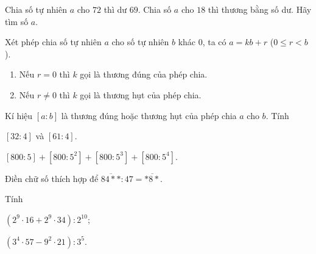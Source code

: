 \begin{bt}
Chia số tự nhiên $ a $ cho $ 72 $ thì dư $ 69 $. Chia số $ a $ cho $ 18 $ thì thương bằng số dư. Hãy tìm số $ a $.
\end{bt}
\begin{bt}
	Xét phép chia số tự nhiên $ a $ cho số tự nhiên $ b $ khác $ 0 $, ta có $ a=kb+r $ ($ 0\leq r<b $).
	\begin{enumerate}[ ]
		\item Nếu $ r=0 $ thì $ k $ gọi là thương đúng của phép chia.
		\item Nếu $ r\neq 0 $ thì $ k $ gọi là thương hụt của phép chia.
	\end{enumerate}
Kí hiệu $ [a:b] $ là thương đúng hoặc thương hụt của phép chia $ a $ cho $ b $. Tính
\begin{enumEX}{2}
	\item $ [32:4] $ và $ [61:4] $.
	\item $ [800:5]+[800:5^{2}]+[800:5^{3}]+[800:5^{4}] $.
\end{enumEX}
\end{bt}
\begin{bt}
Điền chữ số thích hợp để $ \overline{84**}:47=\overline{*8*} $.
\end{bt}
\begin{bt}
Tính 
\begin{enumEX}{2}
	\item $ (2^{9}\cdot 16+2^{9}\cdot 34):2^{10} $;
	\item $ (3^{4}\cdot 57-9^{2}\cdot 21):3^{5} $.
\end{enumEX}
\end{bt}
